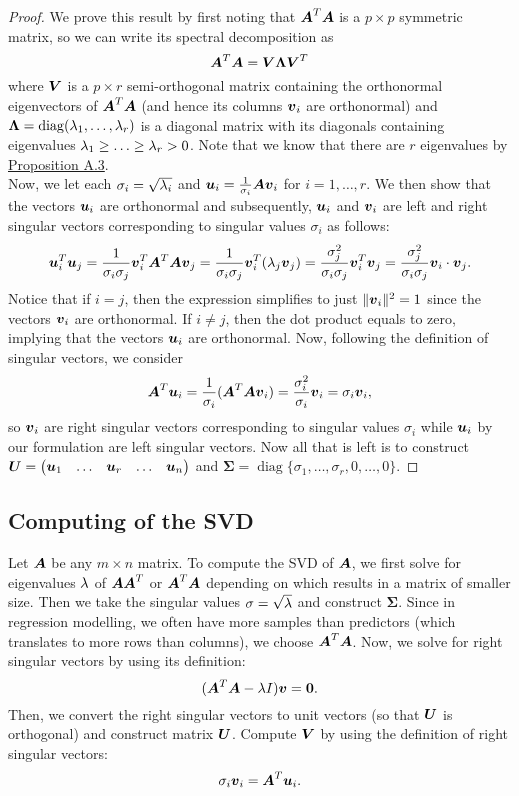\documentclass[12pt]{article}
\DeclareMathOperator{\diag}{diag}
\newcommand{\Sg}{\Sigma}
\begin{document}
	\begin{proof}
		We prove this result by first noting that $\boldsymbol{A}^T\boldsymbol{A}$ is a $p\times p$ symmetric matrix, so we can write its spectral decomposition as
		$$\boldsymbol{A}^T\boldsymbol{A}=\boldsymbol{V}\boldsymbol{\Lambda}\boldsymbol{V}^T$$
		where $\boldsymbol{V}$ is a $p\times r$ {semi-orthogonal} matrix containing the orthonormal eigenvectors of $\boldsymbol{A}^T\boldsymbol{A}$ (and hence its columns $\boldsymbol{v}_i$ are orthonormal) and $\boldsymbol{\Lambda}=\diag(\lm_1,\ldots,\lm_r)$ is a diagonal matrix with its diagonals containing eigenvalues $\lambda_1\geq\ldots\geq\lambda_r>0$. Note that we know that there are $r$ eigenvalues by \hyperref[prop1]{Proposition A.3}. \\
		
		Now, we let each $\sigma_i=\sqrt{\lambda_i}$ and $\boldsymbol{u}_i=\frac{1}{\sigma_i}\boldsymbol{A}\boldsymbol{v}_i$ for $i=1,\ldots,r$. We then show that the vectors $\boldsymbol{u}_i$ are orthonormal and subsequently, $\boldsymbol{u}_i$ and $\boldsymbol{v}_i$ are left and right singular vectors corresponding to singular values $\sigma_i$ as follows:
		\begin{align*}
			\boldsymbol{u}_i^T\boldsymbol{u}_j
			=\frac{1}{\sigma_i\sigma_j}\boldsymbol{v}_i^T{\boldsymbol{A}^T\boldsymbol{A}\boldsymbol{v}_j}
			=\frac{1}{\sigma_i\sigma_j}\boldsymbol{v}_i^T({\lambda_j\boldsymbol{v}_j})
			=\frac{\sigma_j^2}{\sigma_i\sigma_j}\boldsymbol{v}_i^T\boldsymbol{v}_j
			=\frac{\sigma_j^2}{\sigma_i\sigma_j}\boldsymbol{v}_i\cdot\boldsymbol{v}_j.
		\end{align*}
		Notice that if $i=j$, then the expression simplifies to just $\|\boldsymbol{v}_i\|^2=1$ since the vectors $\boldsymbol{v}_i$ are orthonormal. If $i\neq j$, then the dot product equals to zero, implying that the vectors $\boldsymbol{u}_i$ are orthonormal. Now, following the definition of singular vectors, we consider
		$$\boldsymbol{A}^T{\boldsymbol{u}_i}={\frac{1}{\sigma_i}}(\boldsymbol{A}^T{\boldsymbol{A}\boldsymbol{v}_i})=\frac{{\sigma_i^2}}{\sigma_i}{\boldsymbol{v}_i}=\sigma_i\boldsymbol{v}_i,$$
		so $\boldsymbol{v}_i$ are right singular vectors corresponding to singular values $\sigma_i$ while $\boldsymbol{u}_i$ by our formulation are left singular vectors. Now all that is left is to construct $\boldsymbol{U}=\begin{pmatrix}
			\boldsymbol{u}_1 & \ldots & \boldsymbol{u}_r & \ldots & \boldsymbol{u}_n
		\end{pmatrix}$ and $\boldsymbol{\Sg}=\diag\{\sigma_1,\ldots,\sigma_r,0,\ldots,0\}$. 
	\end{proof}
	
	\subsection{Computing of the SVD}
	Let $\boldsymbol{A}$ be any $m\times n$ matrix. To compute the SVD of $\boldsymbol{A}$, we first solve for eigenvalues $\lambda$ of $\boldsymbol{A}\boldsymbol{A}^T$ or $\boldsymbol{A}^T\boldsymbol{A}$ depending on which results in a matrix of smaller size. Then we take the singular values $\sigma=\sqrt{\lambda}$ and construct $\boldsymbol{\Sg}$. Since in regression modelling, we often have more samples than predictors (which translates to more rows than columns), we choose $\boldsymbol{A}^T\boldsymbol{A}$. Now, we solve for right singular vectors by using its definition:
	$$(\boldsymbol{A}^T\boldsymbol{A}-\lambda I)\boldsymbol{v}=\textbf{0}.$$
	Then, we convert the right singular vectors to unit vectors (so that $\boldsymbol{U}$ is orthogonal) and construct matrix $\boldsymbol{U}$. Compute $\boldsymbol{V}$ by using the definition of right singular vectors:
	$$\sigma_i\boldsymbol{v}_i=\boldsymbol{A}^T\boldsymbol{u}_i.$$
	
\end{document}
